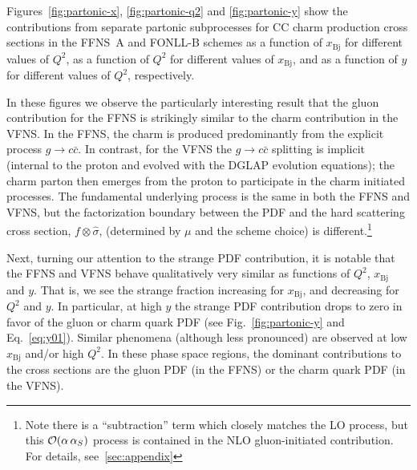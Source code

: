 \documentclass[pdftex,twocolumn,epjc3]{svjour3}          %
\newcommand{\xbj}{\ensuremath{x_{\text{Bj}}}\xspace}
\newcommand{\fonll} {{FONLL-B}\xspace}
\newcommand{\ffns} {{FFNS~A}\xspace}
\begin{document}
Figures~\ref{fig:partonic-x}, \ref{fig:partonic-q2} and
\ref{fig:partonic-y} show the contributions from separate partonic
subprocesses for CC charm production cross sections in the \ffns and
\fonll schemes
 as a function of \xbj for different values of $Q^2$,
 as a function of $Q^2$ for different values of \xbj,
 and as a function of $y$ for different values of $Q^2$, respectively.


 
%
In these figures 
we observe the  particularly interesting result that  
the gluon contribution for the FFNS  is strikingly similar to the charm contribution 
in the VFNS. 
%
In the FFNS, the charm is produced  predominantly from the explicit process $g \to c\bar{c}$. 
In contrast, for the VFNS the  $g\to c\bar{c}$ splitting is implicit (internal to the proton and evolved 
with the DGLAP evolution equations); the charm parton then emerges from the proton
to participate in the charm initiated processes. 
%
The fundamental underlying process is the same in both the FFNS and VFNS, but 
the factorization boundary between the PDF and the hard scattering cross section, 
$f \otimes \hat{\sigma}$,  
(determined by $\mu$ and the scheme choice) is 
different.\footnote{Note 
there is a ``subtraction'' term  which closely 
matches the LO  process, but this ${\cal O}(\alpha \, \alpha_S)$  process is contained in the NLO gluon-initiated contribution.
For details, see~\ref{sec:appendix}
}


Next, turning our attention to the strange PDF contribution,
it is notable that the FFNS and VFNS behave qualitatively very similar
as   functions of $Q^2$, \xbj and $y$.
That is, we see the strange fraction increasing for \xbj, and decreasing for  $Q^2$ and $y$.
%
In particular, at high $y$ the strange PDF contribution drops to zero
in favor of the gluon or charm quark PDF (see
Fig.~\ref{fig:partonic-y} and Eq.~\ref{eq:y01}). Similar phenomena
(although less pronounced) are observed at low \xbj and/or high
$Q^2$. In these phase space regions, the dominant contributions to the
cross sections are the gluon PDF (in the FFNS) or the charm quark PDF
(in the VFNS).
\end{document}
